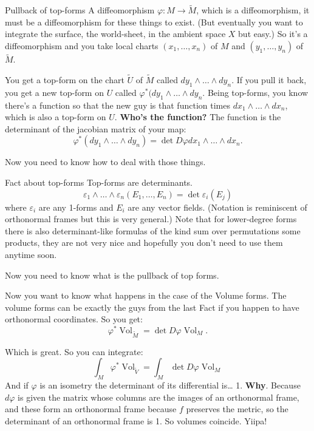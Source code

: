 \begin{thing7}{Pullback of top-forms}\leavevmode
A diffeomorphism \(\varphi:M \to \widetilde M\), which is a diffeomorphism, it must be a diffeomorphism for these things to exist. (But eventually you want to integrate the surface, the world-sheet, in the ambient space \(X\) but easy.) So it's a diffeomorphism and you take local charts \((x_1,\ldots,x_n)\) of \(M\) and \((y_1,\ldots,y_n)\) of \(\widetilde{M}\).

You get a top-form on the chart \(\widetilde{U}\) of \(\widetilde{M}\) called \(dy_1\wedge\ldots \wedge dy_n\). If you pull it back, you get a new top-form on \(U\) called \(\varphi^*(dy_1\wedge\ldots \wedge dy_n\). Being top-forms, you know there's a function so that the new guy is that function times \(dx_1\wedge\ldots\wedge dx_n\), which is also a top-form on \(U\). \textbf{Who's the function?} The function is the determinant of the jacobian matrix of your map:
\[\varphi^*(dy_1\wedge\ldots\wedge dy_n)=\det D\varphi dx_1\wedge\ldots\wedge dx_n.\]
\end{thing7}

Now you need to know how to deal with those things.
\begin{thing7}{Fact about top-forms}\leavevmode
Top-forms are determinants.
\[\varepsilon_1 \wedge \ldots \wedge \varepsilon_n(E_1,\ldots,E_n)=\det \varepsilon_i(E_j)\]
where \(\varepsilon_i\) are any 1-forms and \(E_i\) are any vector fields. (Notation is reminiscent of orthonormal frames but this is very general.) Note that for lower-degree forms there is also determinant-like formulas of the kind sum over permutations some products, they are not very nice and hopefully you don't need to use them anytime soon.
\end{thing7}

Now you need to know what is the pullback of top forms. 

Now you want to know what happens in the case of the Volume forms. The volume forms can be exactly the guys from the last Fact if you happen to have orthonormal coordinates. So you get:
\[\varphi^*\operatorname{Vol}_{\widetilde{M}}=\det D\varphi \operatorname{Vol}_M.\]

Which is great. So you can integrate:
\[\int_M \varphi^*\operatorname{Vol}_{\widetilde{V}}=\int_M \det D\varphi \operatorname{Vol}_M\]
And if \(\varphi\) is an isometry the determinant of its differential is… 1. \textbf{Why}. Because \(d \varphi\) is given the matrix whose columns are the images of an orthonormal frame, and these form an orthonormal frame because \(f\) preserves the metric, so the determinant of an orthonormal frame is 1.  So volumes coincide. Yiipa!


